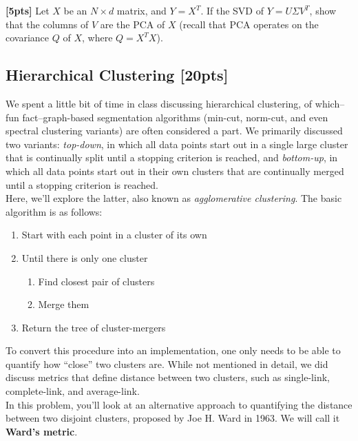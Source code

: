 \documentclass[paper=a4, fontsize=11pt]{scrartcl} %
\numberwithin{figure}{section} %
\numberwithin{table}{section} %
\begin{document}
\textbf{[5pts]} Let $X$ be an $N \times d$ matrix, and $Y = X^T$. If the SVD of $Y = U\Sigma V^T$, show that the columns of $V$ are the PCA of $X$ (recall that PCA operates on the covariance $Q$ of $X$, where $Q = X^TX$).

\subsection{Hierarchical Clustering \textbf{[20pts]}}

We spent a little bit of time in class discussing hierarchical clustering, of which--fun fact--graph-based segmentation algorithms (min-cut, norm-cut, and even spectral clustering variants) are often considered a part. We primarily discussed two variants: \emph{top-down}, in which all data points start out in a single large cluster that is continually split until a stopping criterion is reached, and \emph{bottom-up}, in which all data points start out in their own clusters that are continually merged until a stopping criterion is reached. \\

Here, we'll explore the latter, also known as \emph{agglomerative clustering}. The basic algorithm is as follows: \\

\begin{enumerate}
	\item Start with each point in a cluster of its own
	\item Until there is only one cluster
	\begin{enumerate}
		\item Find closest pair of clusters
		\item Merge them
	\end{enumerate}
	\item Return the tree of cluster-mergers
\end{enumerate}

To convert this procedure into an implementation, one only needs to be able to quantify how ``close'' two clusters are. While not mentioned in detail, we did discuss metrics that define distance between two clusters, such as single-link, complete-link, and average-link. \\

In this problem, you'll look at an alternative approach to quantifying the distance between two disjoint clusters, proposed by Joe H. Ward in 1963. We will call it \textbf{Ward's metric}. \\
\end{document}
